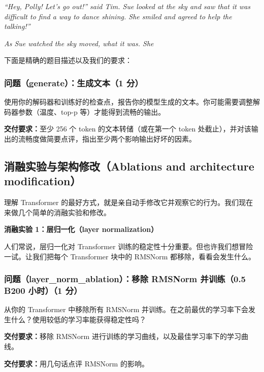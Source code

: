 \textit{``Hey, Polly! Let's go out!'' said Tim. Sue looked at the sky and saw that it was difficult to find a way to dance shining. She smiled and agreed to help the talking!''}

\textit{As Sue watched the sky moved, what it was. She}

下面是精确的题目描述以及我们的要求：

\subsubsection*{问题（generate）：生成文本（1 分）}

使用你的解码器和训练好的检查点，报告你的模型生成的文本。你可能需要调整解码器参数（温度、top-p 等）才能得到流畅的输出。

\textbf{交付要求：}至少 256 个 token 的文本转储（或在第一个  token 处截止），并对该输出的流畅度做简要点评，指出至少两个影响输出好坏的因素。

\subsection{消融实验与架构修改（Ablations and architecture modification）}

理解 Transformer 的最好方式，就是亲自动手修改它并观察它的行为。我们现在来做几个简单的消融实验和修改。

\textbf{消融实验 1：层归一化（layer normalization）}

人们常说，层归一化对 Transformer 训练的稳定性十分重要。但也许我们想冒险一试。让我们把每个 Transformer 块中的 RMSNorm 都移除，看看会发生什么。

\subsubsection*{问题（layer\_norm\_ablation）：移除 RMSNorm 并训练（0.5 B200 小时）（1 分）}

从你的 Transformer 中移除所有 RMSNorm 并训练。在之前最优的学习率下会发生什么？使用较低的学习率能获得稳定性吗？

\textbf{交付要求：}移除 RMSNorm 进行训练的学习曲线，以及最佳学习率下的学习曲线。

\textbf{交付要求：}用几句话点评 RMSNorm 的影响。

